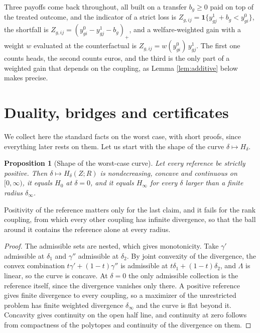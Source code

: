 \documentclass[11pt,a4paper]{article}
\theoremstyle{notesplain}
\newtheorem{proposition}[theorem]{Proposition}
\theoremstyle{notesupright}
\numberwithin{equation}{section}
\begin{document}
Three payoffs come back throughout, all built on a transfer $b_g\ge0$ paid on top of the treated outcome, and the indicator of a strict loss is $Z_{g,ij}=\mathbf 1\{y^1_{gj}+b_g<y^0_{gi}\}$, the shortfall is $Z_{g,ij}=(y^0_{gi}-y^1_{gj}-b_g)_+$, and a welfare-weighted gain with a weight $w$ evaluated at the counterfactual is $Z_{g,ij}=w(y^0_{gi})\,y^1_{gj}$. The first one counts heads, the second counts euros, and the third is the only part of a weighted gain that depends on the coupling, as Lemma \ref{lem:additive} below makes precise.

\section{Duality, bridges and certificates}
\label{sec:duality}
We collect here the standard facts on the worst case, with short proofs, since everything later rests on them. Let us start with the shape of the curve $\delta\mapsto H_\delta$.

\begin{proposition}[Shape of the worst-case curve]
\label{prop:shape}
Let every reference be strictly positive. Then $\delta\mapsto H_\delta(Z;R)$ is nondecreasing, concave and continuous on $[0,\infty)$, it equals $H_0$ at $\delta=0$, and it equals $H_\infty$ for every $\delta$ larger than a finite radius $\delta_\infty$.
\end{proposition}

Positivity of the reference matters only for the last claim, and it fails for the rank coupling, from which every other coupling has infinite divergence, so that the ball around it contains the reference alone at every radius.

\begin{proof}
The admissible sets are nested, which gives monotonicity. Take $\gamma'$ admissible at $\delta_1$ and $\gamma''$ admissible at $\delta_2$. By joint convexity of the divergence, the convex combination $t\gamma'+(1-t)\gamma''$ is admissible at $t\delta_1+(1-t)\delta_2$, and $\Lambda$ is linear, so the curve is concave. At $\delta=0$ the only admissible collection is the reference itself, since the divergence vanishes only there. A positive reference gives finite divergence to every coupling, so a maximizer of the unrestricted problem has finite weighted divergence $\delta_\infty$ and the curve is flat beyond it. Concavity gives continuity on the open half line, and continuity at zero follows from compactness of the polytopes and continuity of the divergence on them.
\end{proof}
\end{document}
